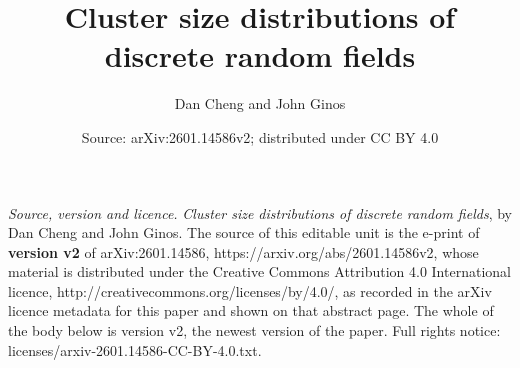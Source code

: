 \documentclass[10pt,a4paper]{amsart}
\theoremstyle{definition}
\begin{document}
\title{Cluster size distributions of discrete random fields}
\author{Dan Cheng and John Ginos}
\date{Source: arXiv:2601.14586v2; distributed under CC BY 4.0}
\maketitle
\noindent\emph{Source, version and licence.} \emph{Cluster size distributions of discrete random fields}, by Dan Cheng and John Ginos. The source of this editable unit is the e-print of \textbf{version v2} of arXiv:2601.14586, https://arxiv.org/abs/2601.14586v2, whose material is distributed under the Creative Commons Attribution 4.0 International licence, http://creativecommons.org/licenses/by/4.0/, as recorded in the arXiv licence metadata for this paper and shown on that abstract page. The whole of the body below is version v2, the newest version of the paper. Full rights notice: licenses/arxiv-2601.14586-CC-BY-4.0.txt.\par\smallskip
\end{document}
